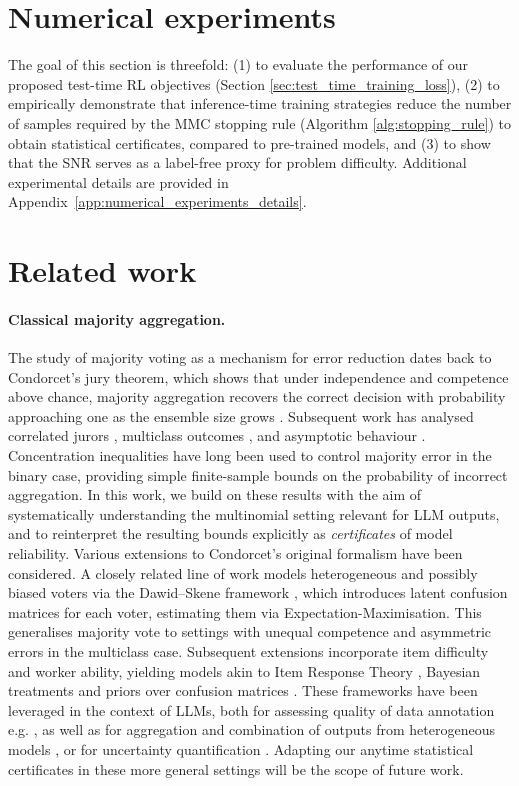\documentclass{article} %
\begin{document}
\section{Numerical experiments}\label{sec:numerical_experiments}
The goal of this section is threefold: (1) to evaluate the performance of our proposed test-time RL objectives (Section \ref{sec:test_time_training_loss}), (2) to empirically demonstrate that inference-time training strategies reduce the number of samples required by the MMC stopping rule (Algorithm \ref{alg:stopping_rule}) to obtain statistical certificates, compared to pre-trained models, and (3) to show that the SNR serves as a label-free proxy for problem difficulty. Additional experimental details are provided in Appendix~\ref{app:numerical_experiments_details}.


\section{Related work}\label{sec:related_work}
\paragraph{Classical majority aggregation.}  
The study of majority voting as a mechanism for error reduction dates back to Condorcet’s jury theorem, which shows that under independence and competence above chance, majority aggregation recovers the correct decision with probability approaching one as the ensemble size grows \citep{condorcet1785essai}. Subsequent work has analysed correlated jurors \citep{ladha1992condorcet}, multiclass outcomes \citep{list2001epistemic}, and asymptotic behaviour \citep{boland1989majority}.  Concentration inequalities have long been used to control majority error in the binary case, providing simple finite-sample bounds on the probability of incorrect aggregation.   In this work, we build on these results with the aim of systematically understanding the multinomial setting relevant for LLM outputs, and to reinterpret the resulting bounds explicitly as \emph{certificates} of model reliability.  Various extensions to Condorcet's original formalism have been considered.   A closely related line of work models heterogeneous and possibly biased voters via the Dawid–Skene framework \citep{dawid_skene_79}, which introduces latent {confusion matrices} for each voter, estimating them via Expectation-Maximisation. This generalises majority vote to settings with unequal competence and asymmetric errors in the multiclass case. Subsequent extensions incorporate item difficulty and worker ability, yielding models akin to Item Response Theory \citep{bock1997brief}, Bayesian treatments and priors over confusion matrices \citep{raykar2010learning,liu2012variational,kim2012bayesian}.   These frameworks have been leveraged in the context of LLMs, both for assessing quality of data annotation e.g. \cite{whitehill2009whose,welinder2010multidimensional}, as well as for aggregation and combination of outputs from heterogeneous models \citep{yao2024bayesian, song2025irt}, or for uncertainty quantification \citep{kang2025uncertainty}.  Adapting our  anytime statistical certificates in these more general settings will be the scope of future work. 
\end{document}
